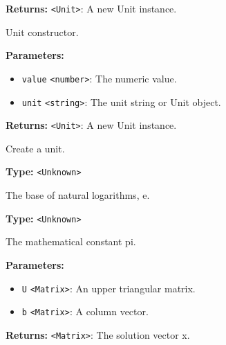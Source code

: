 \documentclass[12pt,a4paper]{article}
\begin{document}
\noindent \textbf{Returns:} \texttt{<Unit>}: A new Unit instance.

\noindent Unit constructor.

\vspace{5mm}
\noindent {}


\noindent \textbf{Parameters:}
\begin{itemize}
  \item \texttt{value} \texttt{<number>}: The numeric value.
  \item \texttt{unit} \texttt{<string>}: The unit string or Unit object.
\end{itemize}

\noindent \textbf{Returns:} \texttt{<Unit>}: A new Unit instance.

\noindent Create a unit.

\vspace{5mm}
\noindent {}\vspace{4mm}


\noindent \textbf{Type:} \texttt{<Unknown>}

\noindent The base of natural logarithms, e.

\vspace{5mm}
\noindent {}\vspace{4mm}


\noindent \textbf{Type:} \texttt{<Unknown>}

\noindent The mathematical constant pi.

\vspace{5mm}
\noindent {}


\noindent \textbf{Parameters:}
\begin{itemize}
  \item \texttt{U} \texttt{<Matrix>}: An upper triangular matrix.
  \item \texttt{b} \texttt{<Matrix>}: A column vector.
\end{itemize}

\noindent \textbf{Returns:} \texttt{<Matrix>}: The solution vector x.
\end{document}
